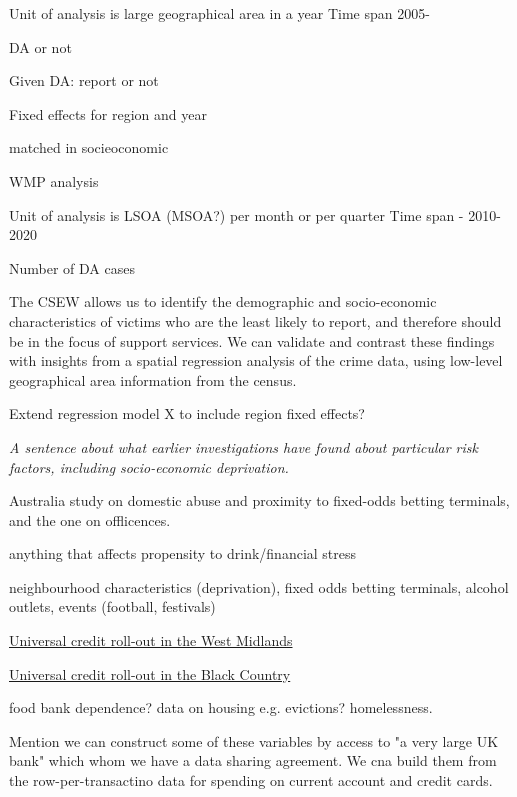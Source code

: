 \documentclass[11pt, a4paper]{article}
\begin{document}
Unit of analysis is large geographical area in a year 
Time span 2005-

DA or not ~

Given DA: report or not ~

Fixed effects for region and year

matched in socieoconomic



WMP analysis

Unit of analysis is LSOA (MSOA?) per month or per quarter
Time span - 2010-2020

Number of DA cases ~ 

The CSEW allows us to identify the demographic and socio-economic characteristics of victims who are the least likely to report, and therefore should be in the focus of support services. We can validate and contrast these findings with insights from a spatial regression analysis of the crime data, using low-level geographical area information from the census. 

Extend regression model X to include region fixed effects?


\textit{A sentence about what earlier investigations have found about particular risk factors, including socio-economic deprivation.} 

Australia study on domestic abuse and proximity to fixed-odds betting terminals, and the one on offlicences.

anything that affects propensity to drink/financial stress

neighbourhood characteristics (deprivation), fixed odds betting terminals, alcohol outlets, events (football, festivals)

\href{https://www.birminghammail.co.uk/news/midlands-news/universal-credit-rolled-out-across-14142901}{Universal credit roll-out in the West Midlands}

\href{https://www.birminghammail.co.uk/black-country/universal-credit-claimants-black-country-15946831}{Universal credit roll-out in the Black Country}


food bank dependence? data on housing e.g. evictions? homelessness.

Mention we can construct some of these variables by access to "a very large UK bank" which whom we have a data sharing agreement. We cna build them from the row-per-transactino data for spending on current account and credit cards.

\newpage



\end{document}
